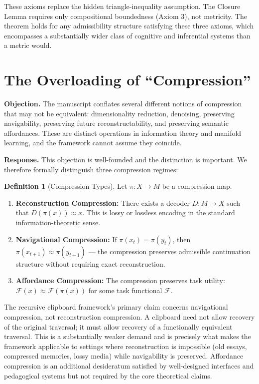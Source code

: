 \documentclass[12pt,oneside]{book}
\theoremstyle{plain}
\theoremstyle{definition}
\newtheorem{definition}[theorem]{Definition}
\theoremstyle{plain}
\begin{document}
These axioms replace the hidden triangle-inequality assumption. The Closure Lemma requires only compositional boundedness (Axiom 3), not metricity. The theorem holds for any admissibility structure satisfying these three axioms, which encompasses a substantially wider class of cognitive and inferential systems than a metric would.

\section{The Overloading of ``Compression''}

\textbf{Objection.} The manuscript conflates several different notions of compression that may not be equivalent: dimensionality reduction, denoising, preserving navigability, preserving future reconstructability, and preserving semantic affordances. These are distinct operations in information theory and manifold learning, and the framework cannot assume they coincide.

\textbf{Response.} This objection is well-founded and the distinction is important. We therefore formally distinguish three compression regimes:

\begin{definition}[Compression Types]
Let $\pi : X \to M$ be a compression map.
\begin{enumerate}[noitemsep]
\item \textbf{Reconstruction Compression:} There exists a decoder $D : M \to X$ such that $D(\pi(x)) \approx x$. This is lossy or lossless encoding in the standard information-theoretic sense.
\item \textbf{Navigational Compression:} If $\pi(x_t) = \pi(y_t)$, then $\pi(x_{t+1}) \approx \pi(y_{t+1})$ — the compression preserves admissible continuation structure without requiring exact reconstruction.
\item \textbf{Affordance Compression:} The compression preserves task utility: $\mathcal{F}(x) \approx \mathcal{F}(\pi(x))$ for some task functional $\mathcal{F}$.
\end{enumerate}
\end{definition}

The recursive clipboard framework's primary claim concerns navigational compression, not reconstruction compression. A clipboard need not allow recovery of the original traversal; it must allow recovery of a functionally equivalent traversal. This is a substantially weaker demand and is precisely what makes the framework applicable to settings where reconstruction is impossible (old essays, compressed memories, lossy media) while navigability is preserved. Affordance compression is an additional desideratum satisfied by well-designed interfaces and pedagogical systems but not required by the core theoretical claims.
\end{document}
